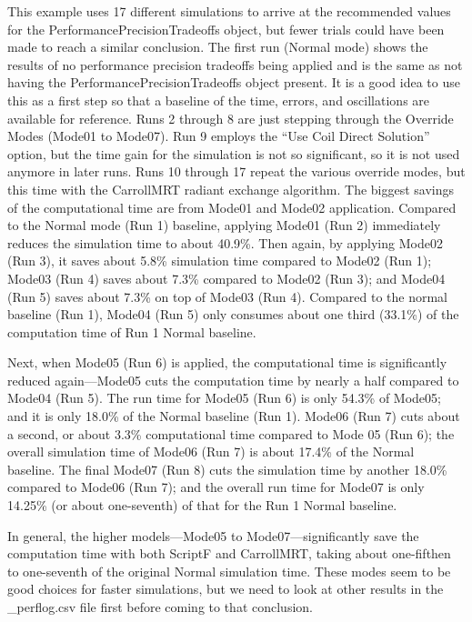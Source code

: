 This example uses 17 different simulations to arrive at the recommended values for the PerformancePrecisionTradeoffs object, but fewer trials could have been made to reach a similar conclusion. The first run (Normal mode) shows the results of no performance precision tradeoffs being applied and is the same as not having the PerformancePrecisionTradeoffs object present. It is a good idea to use this as a first step so that a baseline of the time, errors, and oscillations are available for reference.  Runs 2 through 8 are just stepping through the Override Modes (Mode01 to Mode07). Run 9 employs the ``Use Coil Direct Solution'' option, but the time gain for the simulation is not so significant, so it is not used anymore in later runs.  Runs 10 through 17 repeat the various override modes, but this time with the CarrollMRT radiant exchange algorithm. The biggest savings of the computational time are from Mode01 and Mode02 application. Compared to the Normal mode (Run 1) baseline, applying Mode01 (Run 2) immediately reduces the simulation time to about 40.9\%. Then again, by applying Mode02 (Run 3), it saves about 5.8\% simulation time compared to Mode02 (Run 1); Mode03 (Run 4) saves about 7.3\% compared to Mode02 (Run 3); and Mode04 (Run 5) saves about 7.3\% on top of Mode03 (Run 4). Compared to the normal baseline (Run 1), Mode04 (Run 5) only consumes about one third (33.1\%) of the computation time of Run 1 Normal baseline. 

Next, when Mode05 (Run 6) is applied, the computational time is significantly reduced again---Mode05 cuts the computation time by nearly a half compared to Mode04 (Run 5). The run time for Mode05 (Run 6) is only 54.3\% of Mode05; and it is only 18.0\% of the Normal baseline (Run 1). Mode06 (Run 7) cuts about a second, or about 3.3\% computational time compared to Mode 05 (Run 6); the overall simulation time of Mode06 (Run 7) is about 17.4\% of the Normal baseline. The final Mode07 (Run 8) cuts the simulation time by another 18.0\% compared to Mode06 (Run 7); and the overall run time for Mode07 is only 14.25\% (or about one-seventh) of that for the Run 1 Normal baseline.

In general, the higher models---Mode05 to Mode07---significantly save the computation time with both ScriptF and CarrollMRT, taking about one-fifthen to one-seventh of the original Normal simulation time. These modes seem to be good choices for faster simulations, but we need to look at other results in the \_perflog.csv file first before coming to that conclusion.

